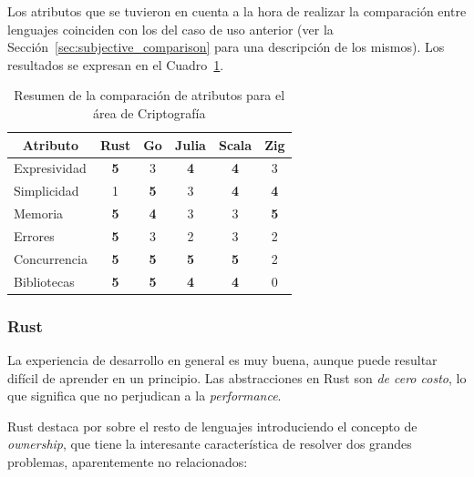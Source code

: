 \documentclass[11pt]{article}
\let\Oldsubsubsection\subsubsection
\renewcommand{\subsubsection}{\FloatBarrier\Oldsubsubsection}
\newcommand{\badMetric}[1]{{\color{BrickRed}#1}}
\newcommand{\goodMetric}[1]{{\textbf{#1}}}
\newcommand{\english}[1]{\textit{#1}}
\newcommand{\technical}[1]{\textit{#1}}
\begin{document}
Los atributos que se tuvieron en cuenta a la hora de realizar la comparación entre lenguajes coinciden con los del caso de uso anterior (ver la Sección~\ref{sec:subjective_comparison} para una descripción de los mismos).
Los resultados se expresan en el Cuadro~\ref{tab:aes:experiences}.

\begin{table}[h]
\centering
\begin{tabular}{|l|c|c|c|c|c|}
\hline
\multicolumn{1}{|c|}{Atributo} & Rust & Go & Julia & Scala & Zig \\ \hline
Expresividad & \goodMetric{5} & 3 & \goodMetric{4} & \goodMetric{4} & 3 \\ \hline
Simplicidad & \badMetric{1} & \goodMetric{5} & 3 & \goodMetric{4} & \goodMetric{4} \\ \hline
Memoria & \goodMetric{5} & \goodMetric{4} & 3 & 3 & \goodMetric{5} \\ \hline
Errores & \goodMetric{5} & 3 & \badMetric{2} & 3 & \badMetric{2} \\ \hline
Concurrencia & \goodMetric{5} & \goodMetric{5} & \goodMetric{5} & \goodMetric{5} & \badMetric{2} \\ \hline
Bibliotecas & \goodMetric{5} & \goodMetric{5} & \goodMetric{4} & \goodMetric{4} & \badMetric{0} \\ \hline
\end{tabular}
\caption{Resumen de la comparación de atributos para el área de Criptografía}
\label{tab:aes:experiences}
\end{table}

\subsubsection{Rust}

La experiencia de desarrollo en general es muy buena, aunque puede resultar difícil de aprender en un principio. Las abstracciones en Rust son \technical{de cero costo}, lo que significa que no perjudican a la \english{performance}.

Rust destaca por sobre el resto de lenguajes introduciendo el concepto de \english{ownership}, que tiene la interesante característica de resolver dos grandes problemas, aparentemente no relacionados:
\end{document}
